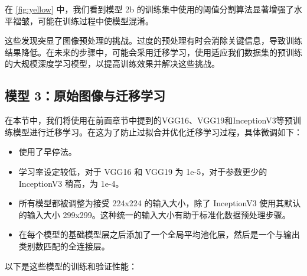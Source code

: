 在 \autoref{fig:yellow} 中，我们看到模型 2b 的训练集中使用的阈值分割算法显著增强了水平褶皱，可能在训练过程中使模型混淆。

这些发现突显了图像预处理的挑战。过度的预处理有时会消除关键信息，导致训练结果降低。在未来的步骤中，可能会采用迁移学习，使用适应我们数据集的预训练的大规模深度学习模型，以提高训练效果并解决这些挑战。

\subsection{模型 3：原始图像与迁移学习}

在本节中，我们将使用在前面章节中提到的VGG16、VGG19和InceptionV3等预训练模型进行迁移学习。在这为了防止过拟合并优化迁移学习过程，具体微调如下：

\begin{itemize}
    \item 使用了早停法。
    \item 学习率设定较低，对于 VGG16 和 VGG19 为 1e-5，对于参数更少的 InceptionV3 稍高，为 1e-4。
    \item 所有模型都被调整为接受 224x224 的输入大小，除了 InceptionV3 使用其默认的输入大小 299x299。这种统一的输入大小有助于标准化数据预处理步骤。
    \item 在每个模型的基础模型层之后添加了一个全局平均池化层，然后是一个与输出类别数匹配的全连接层。
\end{itemize}


以下是这些模型的训练和验证性能：

